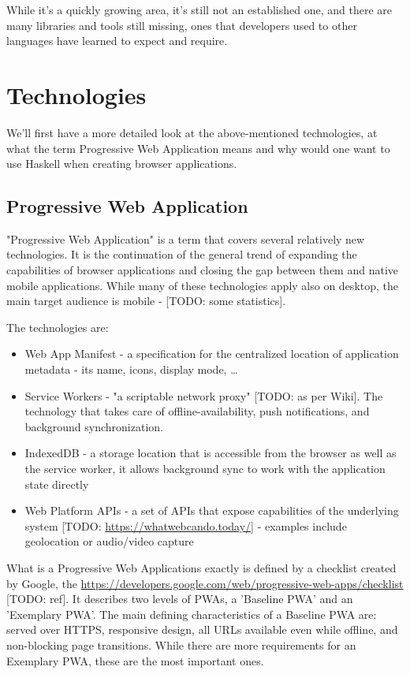\documentclass[english,odsaz]{fitthesis}
\begin{document}
While it's a quickly growing area, it's still not an established one, and there
are many libraries and tools still missing, ones that developers used to other
languages have learned to expect and require.

\chapter{Technologies}
\label{sec:org76a9d36}
We'll first have a more detailed look at the above-mentioned technologies, at
what the term Progressive Web Application means and why would one want to use
Haskell when creating browser applications.

\section{Progressive Web Application}
\label{sec:orgf9b1a0b}
"Progressive Web Application" is a term that covers several relatively new
technologies. It is the continuation of the general trend of expanding the
capabilities of browser applications and closing the gap between them and native
mobile applications. While many of these technologies apply also on desktop, the
main target audience is mobile - [TODO: some statistics].

The technologies are:
\begin{itemize}
\item Web App Manifest - a specification for the centralized location of application
metadata - its name, icons, display mode, \ldots{}
\item Service Workers - "a scriptable network proxy" [TODO: as per Wiki]. The
technology that takes care of offline-availability, push notifications, and
background synchronization.
\item IndexedDB - a storage location that is accessible from the browser as well as
the service worker, it allows background sync to work with the application
state directly
\item Web Platform APIs - a set of APIs that expose capabilities of the underlying
system [TODO: \url{https://whatwebcando.today/}] - examples include geolocation or
audio/video capture
\end{itemize}

What is a Progressive Web Applications exactly is defined by a checklist created
by Google, the \url{https://developers.google.com/web/progressive-web-apps/checklist}
[TODO: ref]. It describes two levels of PWAs, a 'Baseline PWA' and an 'Exemplary
PWA'. The main defining characteristics of a Baseline PWA are: served over
HTTPS, responsive design, all URLs available even while offline, and
non-blocking page transitions. While there are more requirements for an
Exemplary PWA, these are the most important ones.
\end{document}
